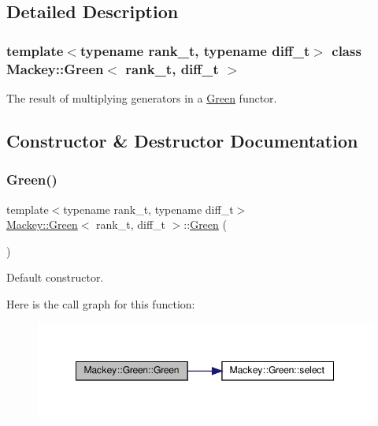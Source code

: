 \subsection{Detailed Description}
\subsubsection*{template$<$typename rank\+\_\+t, typename diff\+\_\+t$>$\newline
class Mackey\+::\+Green$<$ rank\+\_\+t, diff\+\_\+t $>$}

The result of multiplying generators in a \hyperlink{classMackey_1_1Green}{Green} functor. 

\subsection{Constructor \& Destructor Documentation}
\mbox{\label{classMackey_1_1Green_ad3bb0ba97c91a5db4fcf57687a571915}} 
\subsubsection{\texorpdfstring{Green()}{Green()}\hspace{0.1cm}{\footnotesize\ttfamily [1/2]}}
{\footnotesize\ttfamily template$<$typename rank\+\_\+t, typename diff\+\_\+t$>$ \\
\hyperlink{classMackey_1_1Green}{Mackey\+::\+Green}$<$ rank\+\_\+t, diff\+\_\+t $>$\+::\hyperlink{classMackey_1_1Green}{Green} (\begin{DoxyParamCaption}{ }\end{DoxyParamCaption})\hspace{0.3cm}{\ttfamily [inline]}}



Default constructor. 

Here is the call graph for this function\+:\nopagebreak
\begin{figure}[H]
\begin{center}
\leavevmode
\includegraphics[width=348pt]{classMackey_1_1Green_ad3bb0ba97c91a5db4fcf57687a571915_cgraph}
\end{center}
\end{figure}
\mbox{\label{classMackey_1_1Green_a614ae228cc8c5cccddcf562923f06f3a}} 
